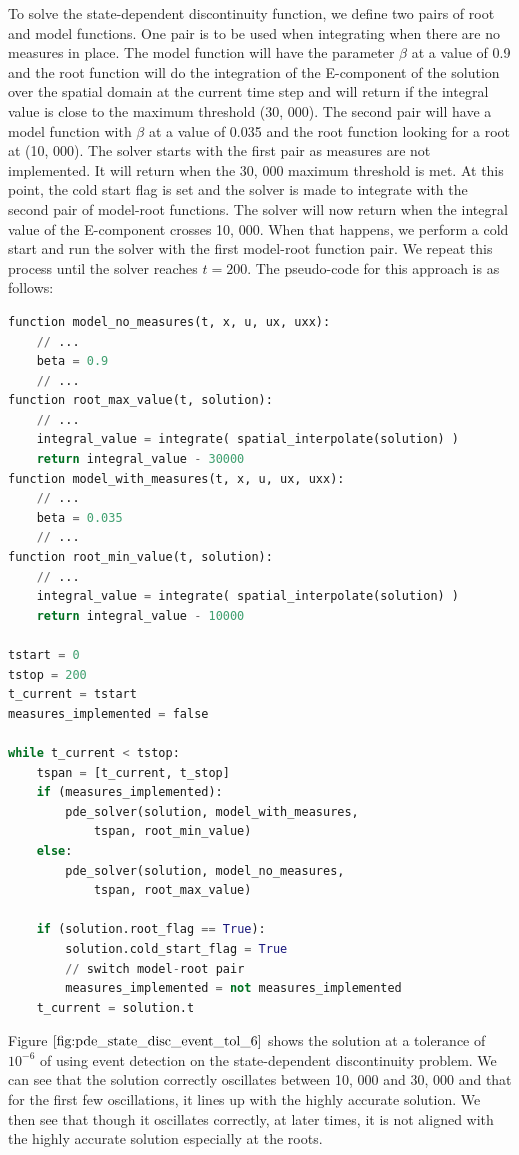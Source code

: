 \documentclass{article}
\begin{document}
To solve the state-dependent discontinuity function, we define two pairs of root and model functions. One pair is to be used when integrating when there are no measures in place. The model function will have the parameter $\beta$ at a value of 0.9 and the root function will do the integration of the E-component of the solution over the spatial domain at the current time step and will return if the integral value is close to the maximum threshold (30, 000). The second pair will have a model function with $\beta$ at a value of 0.035 and the root function looking for a root at (10, 000). The solver starts with the first pair as measures are not implemented. It will return when the 30, 000 maximum threshold is met. At this point, the cold start flag is set and the solver is made to integrate with the second pair of model-root functions. The solver will now return when the integral value of the E-component crosses 10, 000. When that happens, we perform a cold start and run the solver with the first model-root function pair. We repeat this process until the solver reaches $t=200$. The pseudo-code for this approach is as follows:

\begin{minipage}{\linewidth}
\begin{lstlisting}[language=Python]
function model_no_measures(t, x, u, ux, uxx):
	// ...
	beta = 0.9
	// ...
function root_max_value(t, solution):
	// ...
	integral_value = integrate( spatial_interpolate(solution) )
	return integral_value - 30000
function model_with_measures(t, x, u, ux, uxx):
	// ...
	beta = 0.035
	// ...
function root_min_value(t, solution):
	// ...
	integral_value = integrate( spatial_interpolate(solution) )
	return integral_value - 10000

tstart = 0
tstop = 200
t_current = tstart
measures_implemented = false

while t_current < tstop:
	tspan = [t_current, t_stop]
	if (measures_implemented):
		pde_solver(solution, model_with_measures, 
			tspan, root_min_value)
	else:
		pde_solver(solution, model_no_measures, 
			tspan, root_max_value)
	
	if (solution.root_flag == True):
		solution.cold_start_flag = True
		// switch model-root pair
		measures_implemented = not measures_implemented
	t_current = solution.t

\end{lstlisting}
\end{minipage}

Figure $\ref{fig:pde_state_disc_event_tol_6}$ shows the solution at a tolerance of $10^{-6}$ of using event detection on the state-dependent discontinuity problem. We can see that the solution correctly oscillates between 10, 000 and 30, 000 and that for the first few oscillations, it lines up with the highly accurate solution. We then see that though it oscillates correctly, at later times, it is not aligned with the highly accurate solution especially at the roots. 
\end{document}
